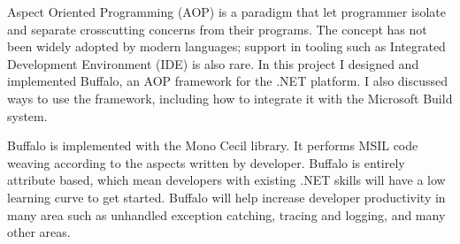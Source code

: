 \begin{abstractpage}
Aspect Oriented Programming (AOP) is a paradigm that let programmer isolate and separate crosscutting concerns from their programs. The concept has not been widely adopted by modern languages; support in tooling such as Integrated Development Environment (IDE) is also rare. In this project I designed and implemented Buffalo, an AOP framework for the .NET platform.  I also discussed ways to use the framework, including how to integrate it with the Microsoft Build system.

Buffalo is implemented with the Mono Cecil library. It performs MSIL code weaving according to the aspects written by developer. Buffalo is entirely attribute based, which mean developers with existing .NET skills will have a low learning curve to get started. Buffalo will help increase developer productivity in many area such as unhandled exception catching, tracing and logging, and many other areas.
\end{abstractpage}
